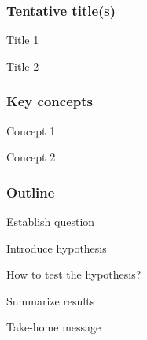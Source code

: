 \subsubsection*{Tentative title(s)}
\begin{substanceList}
    \item Title 1
    \item Title 2
\end{substanceList}

\subsubsection*{Key concepts}
\begin{substanceList}
    \item Concept 1
    \item Concept 2
\end{substanceList}


\subsubsection*{Outline}
\begin{substanceList}
    \item Establish question
    \item Introduce hypothesis
    \item How to test the hypothesis?
    \item Summarize results
    \item Take-home message
\end{substanceList}
